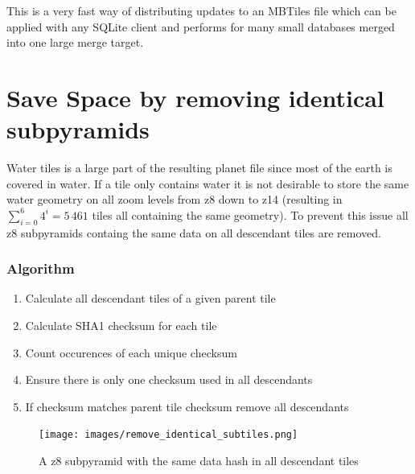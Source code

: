 This is a very fast way of distributing updates to an MBTiles file which can be applied with any SQLite client and performs for many small databases merged into one large merge target.

\newpage{}
\section{Save Space by removing identical subpyramids}

Water tiles is a large part of the resulting planet file since most of the earth is covered in water.
If a tile only contains water it is not desirable to store the same water geometry on all zoom levels
from z8 down to z14 (resulting in $\sum_{i=0}^{6} 4^i = 5\,461$ tiles all containing the same geometry).
To prevent this issue all z8 subpyramids containg the same data on all descendant tiles are removed.

\subsubsection*{Algorithm}

\begin{enumerate}  
    \item Calculate all descendant tiles of a given parent tile
    \item Calculate SHA1 checksum for each tile
    \item Count occurences of each unique checksum
    \item Ensure there is only one checksum used in all descendants
    \item If checksum matches parent tile checksum remove all descendants
\end{enumerate}


\begin{figure}[H]
  \centering
  \texttt{[image: images/remove\_identical\_subtiles.png]}
  \caption{A z8 subpyramid with the same data hash in all descendant tiles}
\end{figure}
